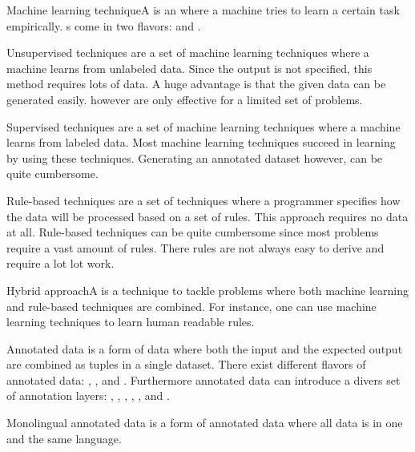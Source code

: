 \documentclass{article}
\begin{document}
\begin{df}{Machine learning technique}A \sb{} is an \tcq{} where a machine tries to learn a certain task empirically. \sb{}s come in two flavors:  and .
\end{df}
\begin{df}{Unsupervised techniques}\sb{} are a set of machine learning techniques where a machine learns from unlabeled data. Since the output is not specified, this method requires lots of data. A huge advantage is that the given data can be generated easily. \sb{} however are only effective for a limited set of problems.
\end{df}
\begin{df}{Supervised techniques}\sb{} are a set of machine learning techniques where a machine learns from labeled data. Most machine learning techniques succeed in learning by using these techniques. Generating an annotated dataset however, can be quite cumbersome.
\end{df}
\begin{df}{Rule-based techniques}\sb{} are a set of techniques where a programmer specifies how the data will be processed based on a set of rules. This approach requires no data at all. Rule-based techniques can be quite cumbersome since most problems require a vast amount of rules. There rules are not always easy to derive and require a lot lot work.
\end{df}
\begin{df}{Hybrid approach}A \sb{} is a technique to tackle problems where both machine learning and rule-based techniques are combined. For instance, one can use machine learning techniques to learn human readable rules.
\end{df}
\begin{df}{Annotated data}\sb{} is a form of data where both the input and the expected output are combined as tuples in a single dataset. There exist different flavors of annotated data: , ,  and . Furthermore annotated data can introduce a divers set of annotation layers: , , , , ,  and .
\end{df}
\begin{df}{Monolingual annotated data}\sb{} is a form of annotated data where all data is in one and the same language.
\end{df}
\end{document}
